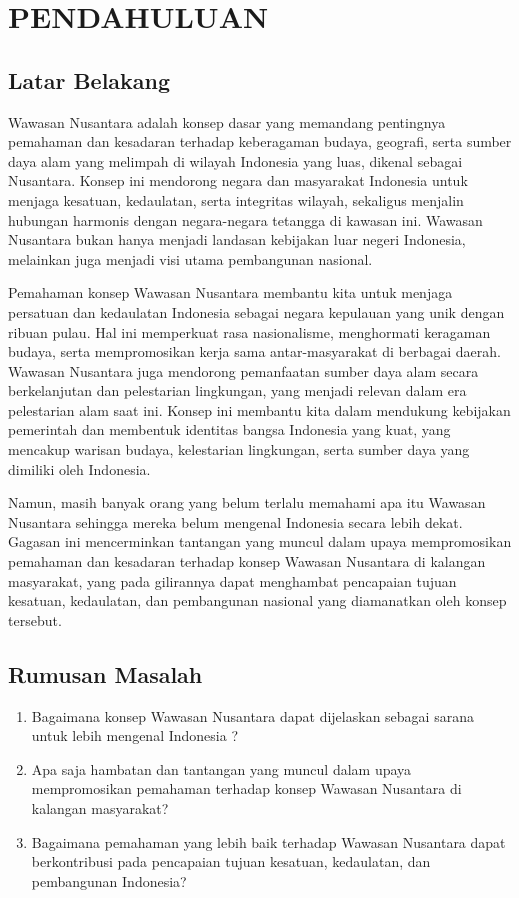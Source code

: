 \chapter{PENDAHULUAN}
\section{Latar Belakang}
Wawasan Nusantara adalah konsep dasar yang memandang pentingnya pemahaman dan kesadaran terhadap keberagaman budaya, geografi, serta sumber daya alam yang melimpah di wilayah Indonesia yang luas, dikenal sebagai Nusantara. Konsep ini mendorong negara dan masyarakat Indonesia untuk menjaga kesatuan, kedaulatan, serta integritas wilayah, sekaligus menjalin hubungan harmonis dengan negara-negara tetangga di kawasan ini. Wawasan Nusantara bukan hanya menjadi landasan kebijakan luar negeri Indonesia, melainkan juga menjadi visi utama pembangunan nasional.

Pemahaman konsep Wawasan Nusantara membantu kita untuk menjaga persatuan dan kedaulatan Indonesia sebagai negara kepulauan yang unik dengan ribuan pulau. Hal ini memperkuat rasa nasionalisme, menghormati keragaman budaya, serta mempromosikan kerja sama antar-masyarakat di berbagai daerah. Wawasan Nusantara juga mendorong pemanfaatan sumber daya alam secara berkelanjutan dan pelestarian lingkungan, yang menjadi relevan dalam era pelestarian alam saat ini. Konsep ini membantu kita dalam mendukung kebijakan pemerintah dan membentuk identitas bangsa Indonesia yang kuat, yang mencakup warisan budaya, kelestarian lingkungan, serta sumber daya yang dimiliki oleh Indonesia.

Namun, masih banyak orang yang belum terlalu memahami apa itu Wawasan Nusantara sehingga mereka belum mengenal Indonesia secara lebih dekat. Gagasan ini mencerminkan tantangan yang muncul dalam upaya mempromosikan pemahaman dan kesadaran terhadap konsep Wawasan Nusantara di kalangan masyarakat, yang pada gilirannya dapat menghambat pencapaian tujuan kesatuan, kedaulatan, dan pembangunan nasional yang diamanatkan oleh konsep tersebut.

\section{Rumusan Masalah}
\begin{enumerate}
\item Bagaimana konsep Wawasan Nusantara dapat dijelaskan sebagai sarana untuk lebih mengenal Indonesia ?
\item Apa saja hambatan dan tantangan yang muncul dalam upaya mempromosikan pemahaman terhadap konsep Wawasan Nusantara di kalangan masyarakat?
\item Bagaimana pemahaman yang lebih baik terhadap Wawasan Nusantara dapat berkontribusi pada pencapaian tujuan kesatuan, kedaulatan, dan pembangunan Indonesia?
\end{enumerate}

